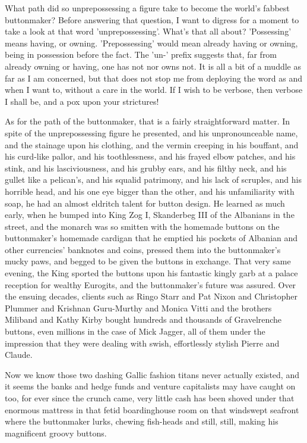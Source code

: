 What path did so unprepossessing a figure take to become the world's fabbest buttonmaker? Before answering that question, I want to digress for a moment to take a look at that word 'unprepossessing'. What's that all about? 'Possessing' means having, or owning. 'Prepossessing' would mean already having or owning, being in possession before the fact. The 'un-' prefix suggests that, far from already owning or having, one has not nor owns not. It is all a bit of a muddle as far as I am concerned, but that does not stop me from deploying the word as and when I want to, without a care in the world. If I wish to be verbose, then verbose I shall be, and a pox upon your strictures!

As for the path of the buttonmaker, that is a fairly straightforward matter. In spite of the unprepossessing figure he presented, and his unpronounceable name, and the stainage upon his clothing, and the vermin creeping in his bouffant, and his curd-like pallor, and his toothlessness, and his frayed elbow patches, and his stink, and his lasciviousness, and his grubby ears, and his filthy neck, and his gullet like a pelican's, and his squalid patrimony, and his lack of scruples, and his horrible head, and his one eye bigger than the other, and his unfamiliarity with soap, he had an almost eldritch talent for button design. He learned as much early, when he bumped into King Zog I, Skanderbeg III of the Albanians in the street, and the monarch was so smitten with the homemade buttons on the buttonmaker's homemade cardigan that he emptied his pockets of Albanian and other currencies' banknotes and coins, pressed them into the buttonmaker's mucky paws, and begged to be given the buttons in exchange. That very same evening, the King sported the buttons upon his fantastic kingly garb at a palace reception for wealthy Eurogits, and the buttonmaker's future was assured. Over the ensuing decades, clients such as Ringo Starr and Pat Nixon and Christopher Plummer and Krishnan Guru-Murthy and Monica Vitti and the brothers Miliband and Kathy Kirby bought hundreds and thousands of Gravelrenche buttons, even millions in the case of Mick Jagger, all of them under the impression that they were dealing with swish, effortlessly stylish Pierre and Claude.

Now we know those two dashing Gallic fashion titans never actually existed, and it seems the banks and hedge funds and venture capitalists may have caught on too, for ever since the crunch came, very little cash has been shoved under that enormous mattress in that fetid boardinghouse room on that windswept seafront where the buttonmaker lurks, chewing fish-heads and still, still, making his magnificent groovy buttons.